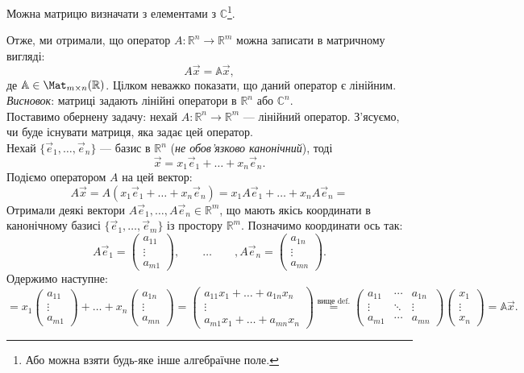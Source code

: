 \documentclass{math_library}
\begin{document}
	\begin{remark}
	Можна матрицю визначати з елементами з $\mathbb{C}$\footnote{Або можна взяти будь-яке інше алгебраїчне поле.}.
	\end{remark}
	\noindent
	Отже, ми отримали, що оператор $A \colon \mathbb{R}^n \to \mathbb{R}^m$ можна записати в матричному вигляді: 
	\[
	A\vec{x} = \mathbb{A} \vec{x},
	\]
	де $\mathbb{A} \in \Mat_{m \times n}(\mathbb{R})$. Цілком неважко показати, що даний оператор є лінійним. \\
	\textit{Висновок}: матриці задають лінійні оператори в $\mathbb{R}^n$ або $\mathbb{C}^n$.
	\bigskip \\
	Поставимо обернену задачу: нехай $A \colon \mathbb{R}^n \to \mathbb{R}^m$ --- лінійний оператор. З'ясуємо, чи буде існувати матриця, яка задає цей оператор.\\
	Нехай $\{\vec{e}_1,\dots, \vec{e}_n\}$ --- базис в $\mathbb{R}^n$ (\textit{не обов'язково канонічний}), тоді 
	\[
	\vec{x} = x_1\vec{e}_1 + \dots + x_n\vec{e}_n.
	\]
	Подіємо оператором $A$ на цей вектор:
	\[
	A\vec{x} = A(x_1\vec{e}_1 + \dots + x_n\vec{e}_n) = x_1A\vec{e}_1 + \dots + x_nA\vec{e}_n \boxed{=}
	\]
	Отримали деякі вектори $A\vec{e}_1, \dots, A\vec{e}_n \in \mathbb{R}^m$, що мають якісь координати в канонічному базисі $\{ \vec{e}_1,\dots,\vec{e}_m\}$ із простору $\mathbb{R}^m$. Позначимо координати ось так:
	\[
	A\vec{e}_1 = \begin{pmatrix} a_{11} \\ \vdots \\ a_{m1} \end{pmatrix}, \qquad \dots \qquad, A\vec{e}_n = \begin{pmatrix} a_{1n} \\ \vdots \\ a_{mn} \end{pmatrix}.
	\]
	Одержимо наступне:
	\[
\boxed{=} x_1 \begin{pmatrix} a_{11} \\ \vdots \\ a_{m1} \end{pmatrix} + \dots +x_n \begin{pmatrix} a_{1n} \\ \vdots \\ a_{mn} \end{pmatrix} = 	
\begin{pmatrix}
	a_{11}x_1 + \dots + a_{1n}x_n \\
	\vdots \\
	a_{m1}x_1 + \dots + a_{mn}x_n
	\end{pmatrix} \overset{\text{вище def.}}{=} \begin{pmatrix}
	a_{11} & \cdots &  a_{1n} \\
	\vdots & \ddots & \vdots \\
	a_{m1} & \cdots & a_{mn}
	\end{pmatrix} \begin{pmatrix}
	x_1 \\ \vdots \\ x_n
	\end{pmatrix} = \mathbb{A}\vec{x}.
	\]
\end{document}
